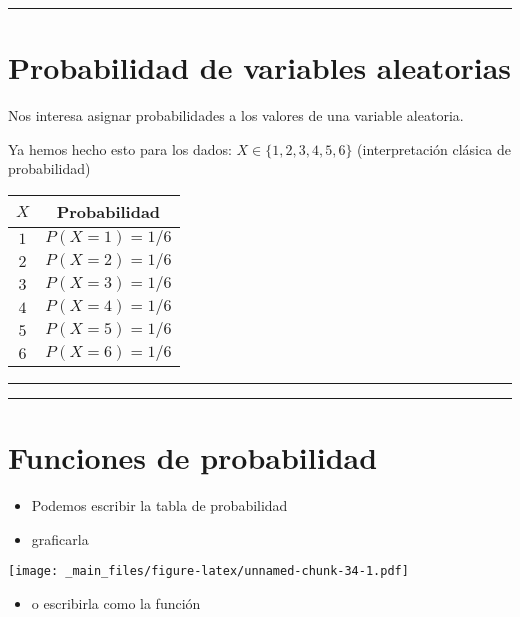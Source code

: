 \documentclass[
]{book}
\providecommand{\tightlist}{%
  \setlength{\itemsep}{0pt}\setlength{\parskip}{0pt}}
\begin{document}
\begin{center}\rule{0.5\linewidth}{0.5pt}\end{center}

\hypertarget{probabilidad-de-variables-aleatorias}{%
\section{Probabilidad de variables aleatorias}\label{probabilidad-de-variables-aleatorias}}

Nos interesa asignar probabilidades a los valores de una variable aleatoria.

Ya hemos hecho esto para los dados: \(X \in \{1,2,3,4,5,6\}\) (interpretación clásica de probabilidad)

\begin{longtable}[]{@{}cc@{}}
\toprule
\(X\) & Probabilidad \\
\midrule
\endhead
\(1\) & \(P(X=1)=1/6\) \\
\(2\) & \(P(X=2)=1/6\) \\
\(3\) & \(P(X=3)=1/6\) \\
\(4\) & \(P(X=4)=1/6\) \\
\(5\) & \(P(X=5)=1/6\) \\
\(6\) & \(P(X=6)=1/6\) \\
\bottomrule
\end{longtable}

\begin{center}\rule{0.5\linewidth}{0.5pt}\end{center}

\begin{center}\rule{0.5\linewidth}{0.5pt}\end{center}

\hypertarget{funciones-de-probabilidad}{%
\section{Funciones de probabilidad}\label{funciones-de-probabilidad}}

\begin{itemize}
\tightlist
\item
  Podemos escribir la tabla de probabilidad
\item
  graficarla
\end{itemize}

\texttt{[image: \_main\_files/figure-latex/unnamed-chunk-34-1.pdf]}

\begin{itemize}
\tightlist
\item
  o escribirla como la función
\end{itemize}
\end{document}
